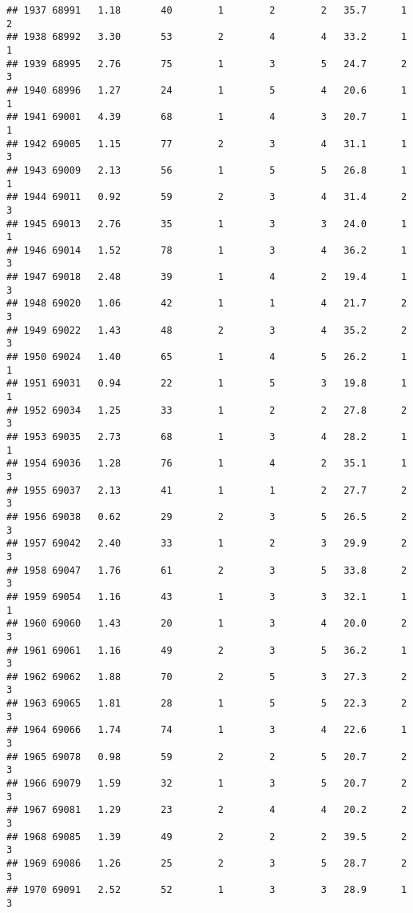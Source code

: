 \documentclass[
]{article}
\begin{document}
\begin{verbatim}
## 1937 68991   1.18       40        1        2        2   35.7      1      2
## 1938 68992   3.30       53        2        4        4   33.2      1      1
## 1939 68995   2.76       75        1        3        5   24.7      2      3
## 1940 68996   1.27       24        1        5        4   20.6      1      1
## 1941 69001   4.39       68        1        4        3   20.7      1      1
## 1942 69005   1.15       77        2        3        4   31.1      1      3
## 1943 69009   2.13       56        1        5        5   26.8      1      1
## 1944 69011   0.92       59        2        3        4   31.4      2      3
## 1945 69013   2.76       35        1        3        3   24.0      1      1
## 1946 69014   1.52       78        1        3        4   36.2      1      3
## 1947 69018   2.48       39        1        4        2   19.4      1      3
## 1948 69020   1.06       42        1        1        4   21.7      2      3
## 1949 69022   1.43       48        2        3        4   35.2      2      3
## 1950 69024   1.40       65        1        4        5   26.2      1      1
## 1951 69031   0.94       22        1        5        3   19.8      1      1
## 1952 69034   1.25       33        1        2        2   27.8      2      3
## 1953 69035   2.73       68        1        3        4   28.2      1      1
## 1954 69036   1.28       76        1        4        2   35.1      1      3
## 1955 69037   2.13       41        1        1        2   27.7      2      3
## 1956 69038   0.62       29        2        3        5   26.5      2      3
## 1957 69042   2.40       33        1        2        3   29.9      2      3
## 1958 69047   1.76       61        2        3        5   33.8      2      3
## 1959 69054   1.16       43        1        3        3   32.1      1      1
## 1960 69060   1.43       20        1        3        4   20.0      2      3
## 1961 69061   1.16       49        2        3        5   36.2      1      3
## 1962 69062   1.88       70        2        5        3   27.3      2      3
## 1963 69065   1.81       28        1        5        5   22.3      2      3
## 1964 69066   1.74       74        1        3        4   22.6      1      3
## 1965 69078   0.98       59        2        2        5   20.7      2      3
## 1966 69079   1.59       32        1        3        5   20.7      2      3
## 1967 69081   1.29       23        2        4        4   20.2      2      3
## 1968 69085   1.39       49        2        2        2   39.5      2      3
## 1969 69086   1.26       25        2        3        5   28.7      2      3
## 1970 69091   2.52       52        1        3        3   28.9      1      3

\end{verbatim}
\end{document}
